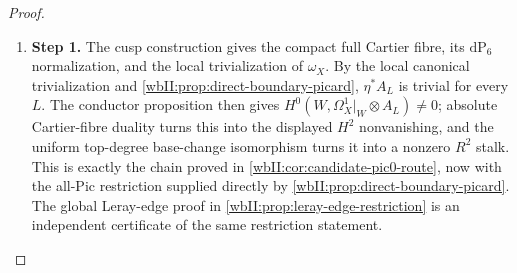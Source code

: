 \begin{proof}
\begin{enumerate}[label={$\langle1\rangle$\arabic*.},leftmargin=*]
\item 
\noindent\textbf{Step 1.} The cusp construction gives the compact full Cartier fibre, its
$\mathrm{dP}_6$ normalization, and the local trivialization of $\omega_X$.
By the local canonical trivialization and
\cref{wbII:prop:direct-boundary-picard}, $\eta^*A_L$ is trivial for every $L$.
The conductor proposition then gives
$H^0(W,\Omega_X^1|_W\otimes A_L)\ne0$; absolute Cartier-fibre duality turns
this into the displayed $H^2$ nonvanishing, and the uniform top-degree
base-change isomorphism turns it into a nonzero $R^2$ stalk.  This is exactly
the chain proved in \cref{wbII:cor:candidate-pic0-route}, now with the all-Pic
restriction supplied directly by \cref{wbII:prop:direct-boundary-picard}.  The
global Leray-edge proof in \cref{wbII:prop:leray-edge-restriction} is an
independent certificate of the same restriction statement.

\end{enumerate}
\end{proof}
